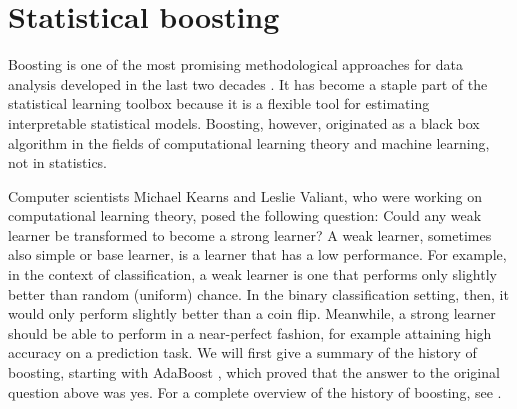 \chapter{Statistical boosting}
Boosting is one of the most promising methodological approaches for data analysis developed in the last two decades \citep{mayr14a}.
It has become a staple part of the statistical learning toolbox because it is a flexible tool for estimating interpretable statistical models.
Boosting, however, originated as a black box algorithm in the fields of computational learning theory and machine learning, not in statistics.

Computer scientists Michael Kearns and Leslie Valiant, who were working on computational learning theory, posed the following question: 
Could any weak learner be transformed to become a strong learner? \citep{kearnsvaliant}
A weak learner, sometimes also simple or base learner, is a learner that has a low performance.
For example, in the context of classification, a weak learner is one that performs only slightly better than random (uniform) chance.
In the binary classification setting, then, it would only perform slightly better than a coin flip.
Meanwhile, a strong learner should be able to perform in a near-perfect fashion, for example attaining high accuracy on a prediction task.
We will first give a summary of the history of boosting, starting with AdaBoost \citep{adaboost}, which proved that the answer to the original question above was yes.
For a complete overview of the history of boosting, see \citet{mayr14a, mayr14b, mayr17}.

